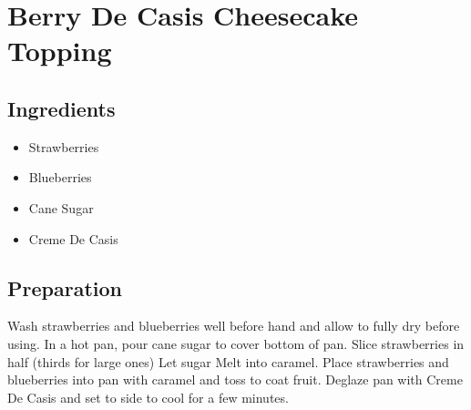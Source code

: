 \section{Berry De Casis Cheesecake Topping}

\subsection*{Ingredients}
\begin{multicols}{3}
	\begin{itemize}
		\item Strawberries
		\item Blueberries
		\item Cane Sugar
		\item Creme De Casis
	\end{itemize}
\end{multicols}

\subsection*{Preparation}

Wash strawberries and blueberries well before hand and allow to fully dry before using. In a hot pan, pour cane sugar to cover bottom of pan. Slice strawberries in half (thirds for large ones) Let sugar Melt into caramel. Place strawberries and blueberries into pan with caramel and toss to coat fruit. Deglaze pan with Creme De Casis and set to side to cool for a few minutes.
